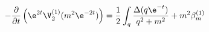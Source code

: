 \begin{equation}
- \frac{\partial}{\partial t} \left( \e^{2t} \V_2^{(1)} (m^2 \e^{-2t})
\right) = \frac{1}{2} \int_q \frac{\Delta (q \e^{-t})}{q^2 + m^2} +
m^2 \beta_m^{(1)}
\end{equation}

